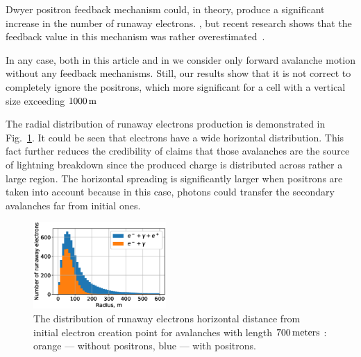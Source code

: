 \documentclass[doublecol,linenumbers]{epl2} %
\begin{document}
Dwyer positron feedback mechanism \cite{Dwyer2012feedback} could, in theory, produce a significant increase in the number of runaway electrons. , but  recent research shows that the feedback value in this mechanism was rather overestimated~\cite{npmdwyer}.

In any case, both in this article and in \cite{Oreshkin_2018} we consider only forward avalanche motion without any feedback mechanisms. Still, our results show that it is not correct to completely ignore the positrons, which  more significant for a cell with a vertical size exceeding $1000\un{m}$ 

The radial distribution of runaway electrons production is demonstrated in Fig.~\ref{fig:rad}. It could be seen that electrons have a wide horizontal distribution. This fact further reduces the credibility of claims that those avalanches are the source of lightning breakdown since the produced charge is distributed across rather a large region. The horizontal spreading is significantly larger when positrons are taken into account because in this case, photons could transfer the secondary avalanches far from initial ones.

\begin{figure}[h]
    \centering
    \includegraphics[width=0.45\textwidth]{figures/radial.eps}
    \caption{The distribution of runaway electrons horizontal distance from initial electron creation point for avalanches with length $700\un{meters}$ : orange --- without positrons, blue --- with positrons. }
    \label{fig:rad}
\end{figure}
\end{document}
